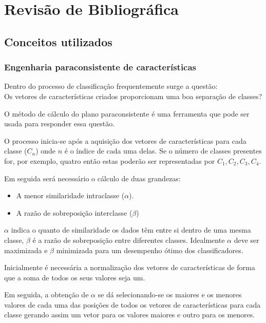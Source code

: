 \chapter{Revisão de Bibliográfica} \label{chap:revBibli}
	\section{Conceitos utilizados}
			\subsection{Engenharia paraconsistente de características}
				\par Dentro do processo de classificação frequentemente surge a questão:\\
				Os vetores de características criados proporcionam uma boa separação de classes?
				
				\par O método de cálculo do plano paraconsistente é uma ferramenta que pode ser usada para responder essa questão.
				
				\par O processo inicia-se após a aquisição dos vetores de características para cada classe ($C_n$) onde $n$ é o índice de cada uma delas. Se o número de classes presentes for, por exemplo, quatro então estas poderão ser representadas por $C_1, C_2, C_3, C_4$.
				\par Em seguida será necessário o cálculo de duas grandezas:
				
				\begin{itemize}
					\item A menor similaridade intraclasse ($\alpha$).
					\item A razão de sobreposição interclasse ($\beta$)
				\end{itemize}
			
				\par $\alpha$ indica o quanto de similaridade os dados têm entre si dentro de uma mesma classe, $\beta$ é a razão de sobreposição entre diferentes classes. Idealmente $\alpha$ deve ser maximizada e $\beta$ minimizada para um desempenho ótimo dos classificadores.
				
				\par Inicialmente é necessária a normalização dos vetores de características de forma que a soma de todos os seus valores seja um.
				
				\par Em seguida, a obtenção de $\alpha$ se dá selecionando-se os maiores e os menores valores de cada uma das posições de todos os vetores de características para cada classe gerando assim um vetor para os valores maiores e outro para os menores.
				
